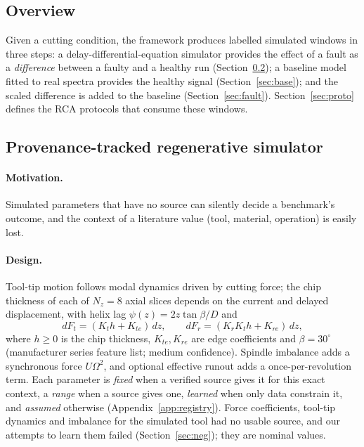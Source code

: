 \documentclass[11pt]{article}
\begin{document}
\subsection{Overview}
Given a cutting condition, the framework produces labelled simulated windows in three steps: a delay-differential-equation simulator provides the effect of a fault as a \emph{difference} between a faulty and a healthy run (Section~\ref{sec:sim}); a baseline model fitted to real spectra provides the healthy signal (Section~\ref{sec:base}); and the scaled difference is added to the baseline (Section~\ref{sec:fault}). Section~\ref{sec:proto} defines the RCA protocols that consume these windows.

\subsection{Provenance-tracked regenerative simulator}\label{sec:sim}
\paragraph{Motivation.} Simulated parameters that have no source can silently decide a benchmark's outcome, and the context of a literature value (tool, material, operation) is easily lost.
\paragraph{Design.} Tool-tip motion follows modal dynamics driven by cutting force; the chip thickness of each of $N_z{=}8$ axial slices depends on the current and delayed displacement, with helix lag $\psi(z)=2z\tan\beta/D$ and
\begin{equation}
dF_t=(K_t h+K_{te})\,dz,\qquad dF_r=(K_r K_t h+K_{re})\,dz,
\end{equation}
where $h\ge 0$ is the chip thickness, $K_{te},K_{re}$ are edge coefficients and $\beta{=}30^\circ$ (manufacturer series feature list; medium confidence). Spindle imbalance adds a synchronous force $U\Omega^2$, and optional effective runout adds a once-per-revolution term. Each parameter is \emph{fixed} when a verified source gives it for this exact context, a \emph{range} when a source gives one, \emph{learned} when only data constrain it, and \emph{assumed} otherwise (Appendix~\ref{app:registry}). Force coefficients, tool-tip dynamics and imbalance for the simulated tool had no usable source, and our attempts to learn them failed (Section~\ref{sec:neg}); they are nominal values.
\end{document}

